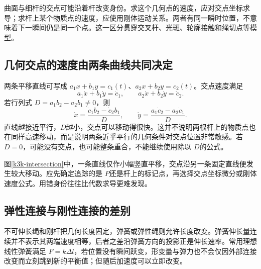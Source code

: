 曲面与细杆的交点可能沿着杆改变身份。求这个几何点的速度，应对交点坐标求导；求杆上某个物质点的速度，应使用刚体运动关系。两者有同一瞬时位置，不意味着下一瞬间仍是同一个点。这一区分贯穿交叉杆、光斑、轮廓接触和绳切点等模型。

\subsection{几何交点的速度由两条曲线共同决定}
两条平移直线可写成 $a_1x+b_1y=c_1(t)$、$a_2x+b_2y=c_2(t)$。交点速度满足
\[a_1\dot x+b_1\dot y=\dot c_1,\qquad
a_2\dot x+b_2\dot y=\dot c_2.\]
若行列式 $D=a_1b_2-a_2b_1\ne0$，则
\[\dot x=\frac{\dot c_1b_2-\dot c_2b_1}{D},\qquad
\dot y=\frac{a_1\dot c_2-a_2\dot c_1}{D}.\]
直线越接近平行，$D$越小，交点可以移动得很快。这并不说明两根杆上的物质点也在同样高速移动，而是说明两条近乎平行的几何条件对交点位置非常敏感。若 $D=0$，可能没有交点，也可能整条重合，不能继续使用除以 $D$的公式。

图\ref{k3k-intersection}中，一条直线仅作小幅竖直平移，交点沿另一条固定直线便发生较大移动。应先确定追踪的是 $P$还是杆上的标记点，再选择交点坐标微分或刚体速度公式。用错身份往往比代数求导更难发现。


\subsection{弹性连接与刚性连接的差别}
不可伸长绳和刚杆把几何长度固定，弹簧或弹性绳则允许长度改变。弹簧伸长量连续并不表示其两端速度相等，后者之差沿弹簧方向的投影正是伸长速率。常用理想线性弹簧满足 $F=k\Delta l$，若位置没有瞬间跃变，形变量与弹力也不会仅因外部连接改变而立刻跳到新的平衡值；但随后加速度可以立即改变。

